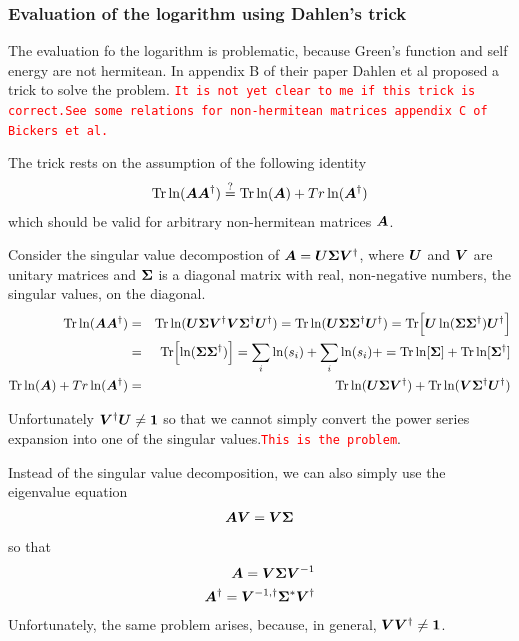 \documentclass[11pt,a4paper]{report}
\newcommand{\petertt}[1]{\textcolor{red}{\texttt{#1}}}
\begin{document}
\subsubsection{Evaluation of the logarithm using Dahlen's trick}
\label{sec:dahlenstrick}
The evaluation fo the logarithm is problematic, because Green's
function and self energy are not hermitean. In appendix B of their
paper\cite{dahlen06_pra73_12511} Dahlen et al proposed a trick to
solve the problem. \petertt{It is not yet clear to me if this trick is
  correct.}\petertt{See some relations for non-hermitean matrices
  appendix C of Bickers et al.\cite{bickers89_ap193_206}}

The trick rests on the assumption of the following identity
\begin{eqnarray}
\mathrm{Tr}\ln(\bm{A}\bm{A}^\dagger)\stackrel{?}{=}
\mathrm{Tr}\ln(\bm{A})+Tr\ln(\bm{A}^\dagger)
\end{eqnarray}
which should be valid for arbitrary non-hermitean matrices $\bm{A}$.

Consider the singular value decompostion of
$\bm{A}=\bm{U}\bm{\Sigma}\bm{V}^\dagger$, where $\bm{U}$ and $\bm{V}$ are
unitary matrices and $\bm{\Sigma}$ is a diagonal matrix with real,
non-negative numbers, the singular values, on the diagonal.
\begin{eqnarray}
\mathrm{Tr}\ln(\bm{A}\bm{A}^\dagger)
&=&\mathrm{Tr}\ln(\bm{U}\bm{\Sigma}\bm{V}^\dagger
\bm{V}\bm{\Sigma}^\dagger\bm{U}^\dagger)
=\mathrm{Tr}\ln(\bm{U}\bm{\Sigma}\bm{\Sigma}^\dagger\bm{U}^\dagger)
=\mathrm{Tr}\Bigl[\bm{U}\ln(\bm{\Sigma}\bm{\Sigma}^\dagger)\bm{U}^\dagger\Bigr]
\nonumber\\
&=&\mathrm{Tr}\Bigl[\ln(\bm{\Sigma}\bm{\Sigma}^\dagger)\Bigr]
=\sum_i \ln(s_i)+\sum_i \ln(s_i)+
=\mathrm{Tr}\ln[\bm{\Sigma}]+\mathrm{Tr}\ln[\bm{\Sigma}^\dagger]
\nonumber\\
\mathrm{Tr}\ln(\bm{A})+Tr\ln(\bm{A}^\dagger)
&=&\mathrm{Tr}\ln(\bm{U}\bm{\Sigma}\bm{V}^\dagger)
+\mathrm{Tr}\ln(\bm{V}\bm{\Sigma}^\dagger\bm{U}^\dagger)
\end{eqnarray}

Unfortunately $\bm{V}^\dagger\bm{U}\neq\bm{1}$ so that we cannot
simply convert the power series expansion into one of the singular
values.\petertt{This is the problem}.


Instead of the singular value decomposition, we can also simply use the
eigenvalue equation
\begin{eqnarray}
\bm{A}\bm{V}=\bm{V}\bm{\Sigma}
\end{eqnarray}
so that
\begin{eqnarray}
\bm{A}=\bm{V}\bm{\Sigma}\bm{V}^{-1}
\nonumber\\
\bm{A}^\dagger=\bm{V}^{-1,\dagger}\bm{\Sigma}^*\bm{V}^{\dagger}
\end{eqnarray}
Unfortunately, the same problem arises, because, in general,
$\bm{V}\bm{V}^\dagger\neq\bm{1}$.
\end{document}

